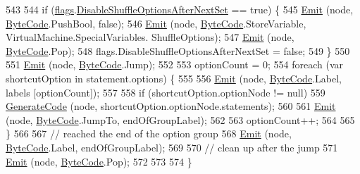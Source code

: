 \begin{DoxyCode}
543 
544             \textcolor{keywordflow}{if} (\hyperlink{a00032_a541022d89bcf9bc8f794eb6d6b438d08}{flags}.\hyperlink{a00032_a8b49bb7763ff477cba21d7c771ef3ed0}{DisableShuffleOptionsAfterNextSet} == \textcolor{keyword}{true}) \{
545                 \hyperlink{a00032_a774e8c143cdda0584fcfdda98626a83c}{Emit} (node, \hyperlink{a00029_ad5dfb6ee68ca7469623ad3e459f98894}{ByteCode}.PushBool, \textcolor{keyword}{false});
546                 \hyperlink{a00032_a774e8c143cdda0584fcfdda98626a83c}{Emit} (node, \hyperlink{a00029_ad5dfb6ee68ca7469623ad3e459f98894}{ByteCode}.StoreVariable, VirtualMachine.SpecialVariables.
      ShuffleOptions);
547                 \hyperlink{a00032_a774e8c143cdda0584fcfdda98626a83c}{Emit} (node, \hyperlink{a00029_ad5dfb6ee68ca7469623ad3e459f98894}{ByteCode}.Pop);
548                 flags.DisableShuffleOptionsAfterNextSet = \textcolor{keyword}{false};
549             \}
550 
551             \hyperlink{a00032_a774e8c143cdda0584fcfdda98626a83c}{Emit} (node, \hyperlink{a00029_ad5dfb6ee68ca7469623ad3e459f98894}{ByteCode}.Jump);
552 
553             optionCount = 0;
554             \textcolor{keywordflow}{foreach} (var shortcutOption \textcolor{keywordflow}{in} statement.options) \{
555 
556                 \hyperlink{a00032_a774e8c143cdda0584fcfdda98626a83c}{Emit} (node, \hyperlink{a00029_ad5dfb6ee68ca7469623ad3e459f98894}{ByteCode}.Label, labels [optionCount]);
557 
558                 \textcolor{keywordflow}{if} (shortcutOption.optionNode != null)
559                     \hyperlink{a00032_a006f3becd521cc179ba3d3352f6f930b}{GenerateCode} (node, shortcutOption.optionNode.statements);
560 
561                 \hyperlink{a00032_a774e8c143cdda0584fcfdda98626a83c}{Emit} (node, \hyperlink{a00029_ad5dfb6ee68ca7469623ad3e459f98894}{ByteCode}.JumpTo, endOfGroupLabel);
562 
563                 optionCount++;
564 
565             \}
566 
567             \textcolor{comment}{// reached the end of the option group}
568             \hyperlink{a00032_a774e8c143cdda0584fcfdda98626a83c}{Emit} (node, \hyperlink{a00029_ad5dfb6ee68ca7469623ad3e459f98894}{ByteCode}.Label, endOfGroupLabel);
569 
570             \textcolor{comment}{// clean up after the jump}
571             \hyperlink{a00032_a774e8c143cdda0584fcfdda98626a83c}{Emit} (node, \hyperlink{a00029_ad5dfb6ee68ca7469623ad3e459f98894}{ByteCode}.Pop);
572 
573 
574         \}
\end{DoxyCode}
